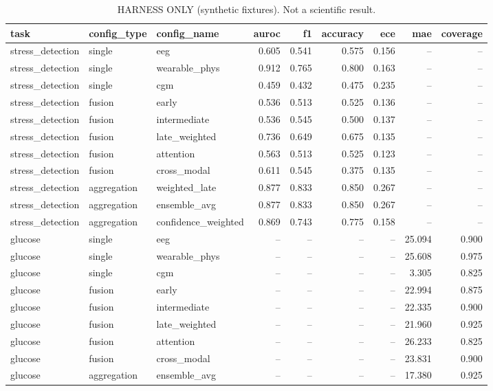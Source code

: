 \begin{table}[t]
\centering
\footnotesize
\caption{HARNESS ONLY (synthetic fixtures). Not a scientific result.}
\label{tab:ablation}
\begin{tabular}{lllrrrrrr}
\toprule
task & config\_type & config\_name & auroc & f1 & accuracy & ece & mae & coverage \\
\midrule
stress\_detection & single & eeg & 0.605 & 0.541 & 0.575 & 0.156 & -- & -- \\
stress\_detection & single & wearable\_phys & 0.912 & 0.765 & 0.800 & 0.163 & -- & -- \\
stress\_detection & single & cgm & 0.459 & 0.432 & 0.475 & 0.235 & -- & -- \\
stress\_detection & fusion & early & 0.536 & 0.513 & 0.525 & 0.136 & -- & -- \\
stress\_detection & fusion & intermediate & 0.536 & 0.545 & 0.500 & 0.137 & -- & -- \\
stress\_detection & fusion & late\_weighted & 0.736 & 0.649 & 0.675 & 0.135 & -- & -- \\
stress\_detection & fusion & attention & 0.563 & 0.513 & 0.525 & 0.123 & -- & -- \\
stress\_detection & fusion & cross\_modal & 0.611 & 0.545 & 0.375 & 0.135 & -- & -- \\
stress\_detection & aggregation & weighted\_late & 0.877 & 0.833 & 0.850 & 0.267 & -- & -- \\
stress\_detection & aggregation & ensemble\_avg & 0.877 & 0.833 & 0.850 & 0.267 & -- & -- \\
stress\_detection & aggregation & confidence\_weighted & 0.869 & 0.743 & 0.775 & 0.158 & -- & -- \\
glucose & single & eeg & -- & -- & -- & -- & 25.094 & 0.900 \\
glucose & single & wearable\_phys & -- & -- & -- & -- & 25.608 & 0.975 \\
glucose & single & cgm & -- & -- & -- & -- & 3.305 & 0.825 \\
glucose & fusion & early & -- & -- & -- & -- & 22.994 & 0.875 \\
glucose & fusion & intermediate & -- & -- & -- & -- & 22.335 & 0.900 \\
glucose & fusion & late\_weighted & -- & -- & -- & -- & 21.960 & 0.925 \\
glucose & fusion & attention & -- & -- & -- & -- & 26.233 & 0.825 \\
glucose & fusion & cross\_modal & -- & -- & -- & -- & 23.831 & 0.900 \\
glucose & aggregation & ensemble\_avg & -- & -- & -- & -- & 17.380 & 0.925 \\
\bottomrule
\end{tabular}
\end{table}
